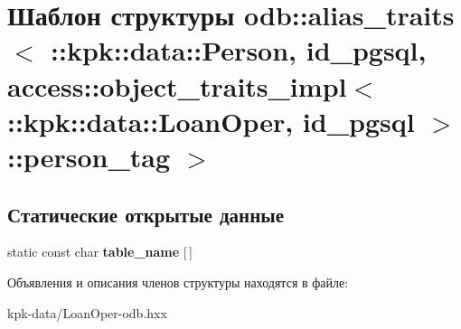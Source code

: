 \hypertarget{structodb_1_1alias__traits_3_01_01_01_01_01_01_01_01_01_01_01_01_01_01_01_01_01_01_1_1kpk_1_1dat5238b9ca584c65048e8db66fd66dcddf}{}\section{Шаблон структуры odb\+:\+:alias\+\_\+traits$<$ \+:\+:kpk\+:\+:data\+:\+:Person, id\+\_\+pgsql, access\+:\+:object\+\_\+traits\+\_\+impl$<$ \+:\+:kpk\+:\+:data\+:\+:Loan\+Oper, id\+\_\+pgsql $>$\+:\+:person\+\_\+tag $>$}
\label{structodb_1_1alias__traits_3_01_01_01_01_01_01_01_01_01_01_01_01_01_01_01_01_01_01_1_1kpk_1_1dat5238b9ca584c65048e8db66fd66dcddf}
\subsection*{Статические открытые данные}
\begin{DoxyCompactItemize}
\item 
static const char {\bfseries table\+\_\+name} \mbox{[}$\,$\mbox{]}\hypertarget{structodb_1_1alias__traits_3_01_01_01_01_01_01_01_01_01_01_01_01_01_01_01_01_01_01_1_1kpk_1_1dat5238b9ca584c65048e8db66fd66dcddf_a0e6a4c210c0bfde714387331d1ebc8bb}{}\label{structodb_1_1alias__traits_3_01_01_01_01_01_01_01_01_01_01_01_01_01_01_01_01_01_01_1_1kpk_1_1dat5238b9ca584c65048e8db66fd66dcddf_a0e6a4c210c0bfde714387331d1ebc8bb}

\end{DoxyCompactItemize}


Объявления и описания членов структуры находятся в файле\+:\begin{DoxyCompactItemize}
\item 
kpk-\/data/Loan\+Oper-\/odb.\+hxx\end{DoxyCompactItemize}

